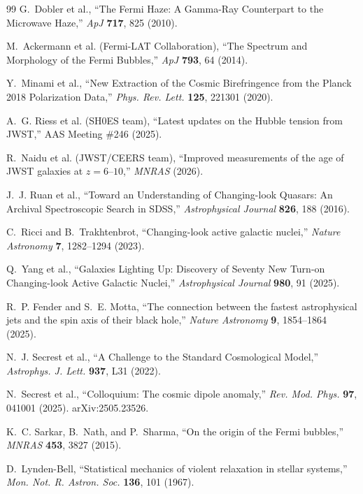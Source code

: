 \documentclass[11pt,a4paper]{article}
\begin{document}
\begin{thebibliography}{99}
G.~Dobler et al., ``The Fermi Haze: A Gamma-Ray Counterpart to the
Microwave Haze,'' \textit{ApJ} \textbf{717}, 825 (2010).

M.~Ackermann et al. (Fermi-LAT Collaboration), ``The Spectrum and
Morphology of the Fermi Bubbles,'' \textit{ApJ} \textbf{793}, 64 (2014).

Y.~Minami et al., ``New Extraction of the Cosmic Birefringence from the
Planck 2018 Polarization Data,'' \textit{Phys. Rev. Lett.} \textbf{125},
221301 (2020).

A.~G. Riess et al. (SH0ES team), ``Latest updates on the Hubble tension
from JWST,'' AAS Meeting \#246 (2025).

R.~Naidu et al. (JWST/CEERS team), ``Improved measurements of the age of
JWST galaxies at $z=6$--$10$,'' \textit{MNRAS} (2026).

J.~J. Ruan et al.,
``Toward an Understanding of Changing-look Quasars: An Archival Spectroscopic Search in SDSS,''
\textit{Astrophysical Journal} \textbf{826}, 188 (2016).

C.~Ricci and B.~Trakhtenbrot,
``Changing-look active galactic nuclei,''
\textit{Nature Astronomy} \textbf{7}, 1282--1294 (2023).

Q.~Yang et al.,
``Galaxies Lighting Up: Discovery of Seventy New Turn-on Changing-look Active Galactic Nuclei,''
\textit{Astrophysical Journal} \textbf{980}, 91 (2025).

R.~P. Fender and S.~E. Motta,
``The connection between the fastest astrophysical jets and the spin axis of their black hole,''
\textit{Nature Astronomy} \textbf{9}, 1854--1864 (2025).

N.~J. Secrest et al., ``A Challenge to the Standard Cosmological Model,''
\textit{Astrophys. J. Lett.} \textbf{937}, L31 (2022).

N.~Secrest et al., ``Colloquium: The cosmic dipole anomaly,''
\textit{Rev. Mod. Phys.} \textbf{97}, 041001 (2025). arXiv:2505.23526.

K.~C. Sarkar, B.~Nath, and P.~Sharma, ``On the origin of the Fermi bubbles,''
\textit{MNRAS} \textbf{453}, 3827 (2015).

D.~Lynden-Bell, ``Statistical mechanics of violent relaxation in stellar
systems,'' \textit{Mon. Not. R. Astron. Soc.} \textbf{136}, 101 (1967).


\end{thebibliography}
\end{document}
